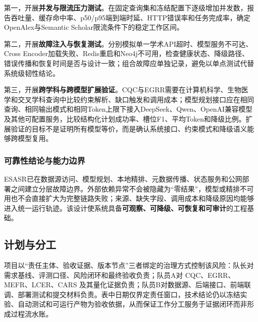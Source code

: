 \documentclass[a4paper,12pt,fontset=none]{ctexart}
\begin{document}
第一，开展\textbf{并发与限流压力测试}。在固定查询集和冻结配置下逐级增加并发数，报告吞吐量、缓存命中率、p50/p95端到端时延、HTTP错误率和任务完成率，确定OpenAlex与Semantic Scholar限流条件下的稳定工作区间。

第二，开展\textbf{故障注入与恢复测试}。分别模拟单一学术API超时、模型服务不可达、Cross Encoder加载失败、Redis重启和Neo4j不可用，检查健康状态、降级路径、错误传播和恢复时间是否与设计一致；组合故障应单独记录，避免以单点测试代替系统级韧性结论。

第三，开展\textbf{跨学科与跨模型扩展验证}。CQC与EGRR需要在计算机科学、生物医学和交叉学科查询中比较约束解析、缺口触发和调用成本；模型规划接口应在相同查询、相同输出模式和相同Token上限下接入DeepSeek、Qwen、OpenAI兼容模型及其他可配置服务，比较结构化计划成功率、槽位F1、平均Token和降级比例。扩展验证的目标不是证明所有模型等价，而是确认系统接口、约束模式和降级语义能够跨模型复用。

\subsubsection{可靠性结论与能力边界}

ESASR已在数据源访问、模型规划、本地精排、元数据传播、状态服务和公网部署之间建立分层故障边界。外部依赖异常不会被隐藏为“零结果”，模型或精排不可用也不会直接扩大为完整链路失败；来源、缺失字段、调用成本和降级原因均能够进入统一运行轨迹。该设计使系统具备\textbf{可观察、可降级、可恢复和可审计}的工程基础。
\subsection{计划与分工}

项目以“责任主体、验收证据、版本节点”三者绑定的治理方式控制该风险：队长对需求基线、评测口径、风险闭环和最终验收负责；队员A对 CQC、EGRR、MEFR、LCER、CARS 及其量化证据负责；队员B对数据源、后端接口、前端联调、部署测试和提交材料负责。表中日期仅界定责任窗口，技术结论仍以冻结实验、自动测试和可运行产物为验收依据，从而保证工作分工服务于证据闭环而非形成过程流水账。
\end{document}
